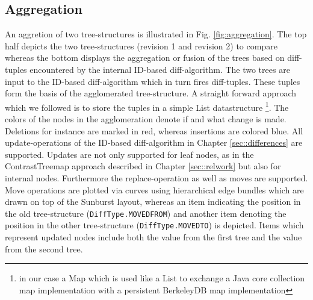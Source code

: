 \subsection{Aggregation}\label{subsec::aggregation}
An aggretion of two tree-structures is illustrated in Fig. \ref{fig:aggregation}. The top half depicts the two tree-structures (revision 1 and revision 2) to compare whereas the bottom displays the aggregation or fusion of the trees based on diff-tuples encountered by the internal ID-based diff-algorithm. The two trees are input to the ID-based diff-algorithm which in turn fires diff-tuples. These tuples form the basis of the agglomerated tree-structure. A straight forward approach which we followed is to store the tuples in a simple List datastructure \footnote{in our case a Map which is used like a List to exchange a Java core collection map implementation with a persistent BerkeleyDB map implementation}. The colors of the nodes in the agglomeration denote if and what change is made. Deletions for instance are marked in red, whereas insertions are colored blue. All update-operations of the ID-based diff-algorithm in Chapter \ref{sec::differences} are supported. Updates are not only supported for leaf nodes, as in the ContrastTreemap approach described in Chapter \ref{sec::relwork} but also for internal nodes. Furthermore the replace-operation as well as moves are supported. Move operations are plotted via curves using hierarchical edge bundles which are drawn on top of the Sunburst layout, whereas an item indicating the position in the old tree-structure (\texttt{DiffType.MOVEDFROM}) and another item denoting the position in the other tree-structure (\texttt{DiffType.MOVEDTO}) is depicted. Items which represent updated nodes include both the value from the first tree and the value from the second tree.

